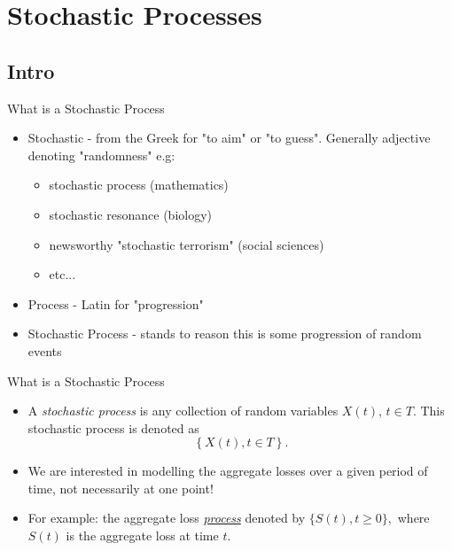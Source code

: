 \documentclass[11pt]{beamer}
\begin{document}
\section{Stochastic Processes}
\subsection{Intro}
\begin{frame}{What is a Stochastic Process}

\begin{itemize}

\item Stochastic - from the Greek for "to aim" or "to guess". Generally adjective denoting "randomness" e.g:
\begin{itemize}
\item stochastic process (mathematics)
\item stochastic resonance (biology)
\item newsworthy "stochastic terrorism" (social sciences)
\item etc...
\end{itemize}

\vfill 

\item Process - Latin for "progression" 

\vfill 

\item Stochastic Process - stands to reason this is some progression of random events

\end{itemize}


\end{frame}
\begin{frame}{What is a Stochastic Process}

\begin{itemize}
\item A \alert{\textit{stochastic process}} is any collection of
random variables $X\left( t\right) $, $t\in T$. This stochastic process is denoted as
\begin{equation*}
\left\{ X\left( t\right) ,t\in T\right\} .
\end{equation*}%

\vfill

\item We are interested in modelling the aggregate losses over a given period of time, not necessarily \alert{at one point}!

\vfill

\item For example: the aggregate loss \underline{\emph{process}} denoted by $\{S(t), t\ge0\},$ where $S(t)$ is the aggregate loss \alert{at time $t$}.
\end{itemize}

\end{frame}
\end{document}

